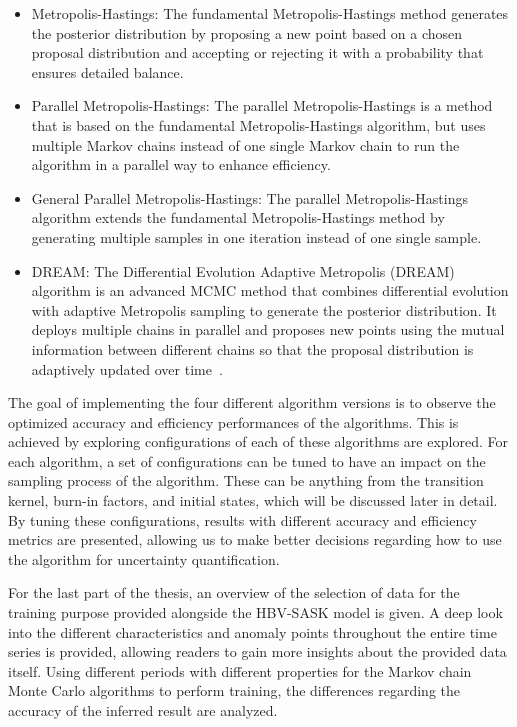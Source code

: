 \begin{itemize}
    \item Metropolis-Hastings: The fundamental Metropolis-Hastings method generates the posterior distribution by proposing a new point based on a chosen proposal distribution and accepting or rejecting it with a probability that ensures detailed balance.\cite{detailed_balance} 
    \item Parallel Metropolis-Hastings: The parallel Metropolis-Hastings is a method that is based on the fundamental Metropolis-Hastings algorithm, but uses multiple Markov chains instead of one single Markov chain to run the algorithm in a parallel way to enhance efficiency.
    \item General Parallel Metropolis-Hastings: The parallel Metropolis-Hastings algorithm extends the fundamental Metropolis-Hastings method by generating multiple samples in one iteration instead of one single sample.
    \item DREAM: The Differential Evolution Adaptive Metropolis (DREAM) algorithm is an advanced MCMC method that combines differential evolution with adaptive Metropolis sampling to generate the posterior distribution. It deploys multiple chains in parallel and proposes new points using the mutual information between different chains so that the proposal distribution is adaptively updated over time~\cite{dream}.
\end{itemize}

The goal of implementing the four different algorithm versions is to observe the optimized accuracy and efficiency performances of the algorithms. This is achieved by exploring configurations of each of these algorithms are explored. For each algorithm, a set of configurations can be tuned to have an impact on the sampling process of the algorithm. These can be anything from the transition kernel, burn-in factors, and initial states, which will be discussed later in detail. By tuning these configurations, results with different accuracy and efficiency metrics are presented, allowing us to make better decisions regarding how to use the algorithm for uncertainty quantification.

For the last part of the thesis, an overview of the selection of data for the training purpose provided alongside the HBV-SASK model is given. A deep look into the different characteristics and anomaly points throughout the entire time series is provided, allowing readers to gain more insights about the provided data itself. Using different periods with different properties for the Markov chain Monte Carlo algorithms to perform training, the differences regarding the accuracy of the inferred result are analyzed.